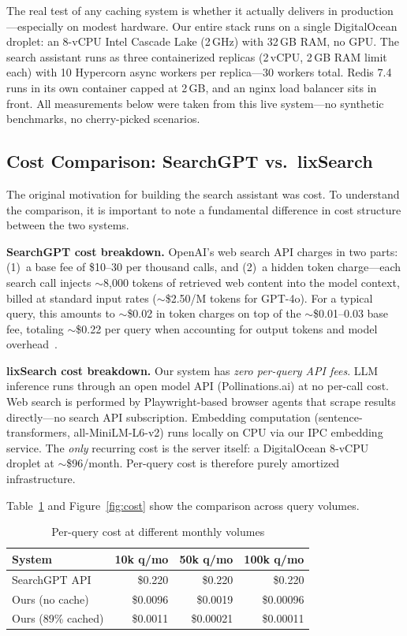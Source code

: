 \documentclass[conference]{IEEEtran}
\begin{document}
The real test of any caching system is whether it actually delivers in production---especially on modest hardware. Our entire stack runs on a single DigitalOcean droplet: an 8-vCPU Intel Cascade Lake (2\,GHz) with 32\,GB RAM, no GPU. The search assistant runs as three containerized replicas (2\,vCPU, 2\,GB RAM limit each) with 10 Hypercorn async workers per replica---30 workers total. Redis 7.4 runs in its own container capped at 2\,GB, and an nginx load balancer sits in front. All measurements below were taken from this live system---no synthetic benchmarks, no cherry-picked scenarios.

\subsection{Cost Comparison: SearchGPT vs.\ lixSearch}

The original motivation for building the search assistant was cost. To understand the comparison, it is important to note a fundamental difference in cost structure between the two systems.

\textbf{SearchGPT cost breakdown.} OpenAI's web search API charges in two parts: (1)~a base fee of \$10--30 per thousand calls, and (2)~a hidden token charge---each search call injects ${\sim}$8{,}000 tokens of retrieved web content into the model context, billed at standard input rates (${\sim}$\$2.50/M tokens for GPT-4o). For a typical query, this amounts to ${\sim}$\$0.02 in token charges on top of the ${\sim}$\$0.01--0.03 base fee, totaling ${\sim}$\$0.22 per query when accounting for output tokens and model overhead~\cite{openai_search_pricing, openai_search_billing}.

\textbf{lixSearch cost breakdown.} Our system has \emph{zero per-query API fees}. LLM inference runs through an open model API (Pollinations.ai) at no per-call cost. Web search is performed by Playwright-based browser agents that scrape results directly---no search API subscription. Embedding computation (sentence-transformers, all-MiniLM-L6-v2) runs locally on CPU via our IPC embedding service. The \emph{only} recurring cost is the server itself: a DigitalOcean 8-vCPU droplet at ${\sim}$\$96/month. Per-query cost is therefore purely amortized infrastructure.

Table~\ref{tab:cost} and Figure~\ref{fig:cost} show the comparison across query volumes.

\begin{table}[h]
\centering
\caption{Per-query cost at different monthly volumes}
\label{tab:cost}
{\small
\begin{tabular}{@{}lrrr@{}}
\toprule
\textbf{System} & \textbf{10k q/mo} & \textbf{50k q/mo} & \textbf{100k q/mo} \\
\midrule
SearchGPT API & \$0.220 & \$0.220 & \$0.220 \\
Ours (no cache) & \$0.0096 & \$0.0019 & \$0.00096 \\
Ours (89\% cached) & \$0.0011 & \$0.00021 & \$0.00011 \\
\bottomrule
\end{tabular}}
\end{table}
\end{document}
